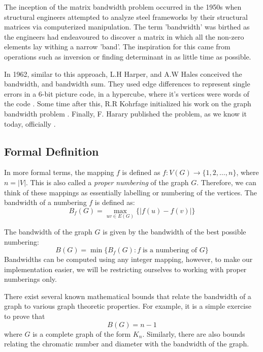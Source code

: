 \documentclass[conference,compsoc]{IEEEtran}
\begin{document}
The inception of the matrix bandwidth problem occurred in the 1950s when structural engineers 
attempted to analyze steel frameworks by their structural matrices via computerized manipulation. The term 'bandwidth' 
was birthed as the engineers had endeavoured to discover a matrix in which all the non-zero elements 
lay withing a narrow 'band'. The inspiration for this came from operations such as 
inversion or finding determinant in as little time as possible.

In 1962, similar to this approach, L.H Harper, and A.W Hales conceived the bandwidth, 
and bandwidth sum. They used edge differences to represent single errors in a 6-bit picture code, 
in a hypercube, where it's vertices were words of the code \cite{10.2307/2946514}. Some time after this, 
R.R Kohrfage initialized his work on the graph bandwidth problem \cite{ccdg1982}. Finally, F. Harary 
published the problem, as we know it today, officially \cite{https://doi.org/10.1002/bimj.19660080427}.

\subsection{Formal Definition}
In more formal terms, 
the mapping $f$ is defined as $f: V(G) \to \{1, 2, \dots, n\}$, where $n = |V|$. This is also called 
a \emph{proper numbering} of the graph $G$.\cite{Lee2016} Therefore, 
we can think of these mappings as essentially labelling or numbering of the vertices. The bandwidth of a numbering $f$
is defined as:
\begin{equation}
B_f(G) = \max_{uv \in E(G)}\{|f(u) - f(v)|\}
\end{equation}

The bandwidth of the graph $G$ is given by the bandwidth of the best possible numbering:
\begin{equation}
  B(G) = \min \{B_f(G): f \; \text{is a numbering of }  G\}
\end{equation}
Bandwidths can be computed using any integer mapping, however, to make our implementation 
easier, we will be restricting ourselves to working with proper numberings only.

There exist several known mathematical bounds that relate the bandwidth of a graph 
to various graph theoretic properties. For example, it is a simple exercise to prove that 
\[B(G) = n - 1\] where $G$ is a complete graph of the form $K_n$. Similarly, there are also bounds 
relating the chromatic number and diameter with the bandwidth of the graph.  \cite{ccdg1982}
\end{document}
